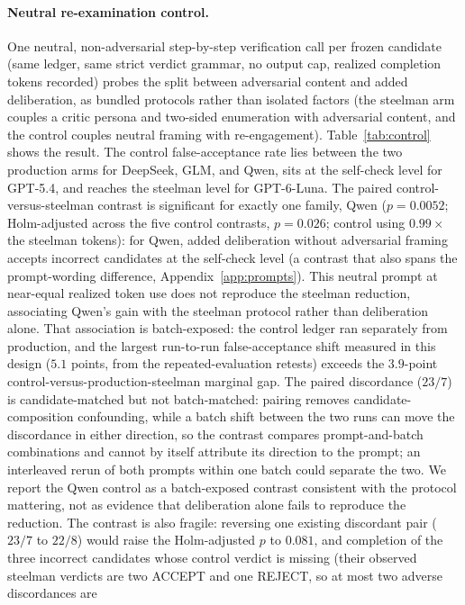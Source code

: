 \documentclass[a4paper,journal]{IAENGtran}
\begin{document}
\paragraph{Neutral re-examination control.} One neutral, non-adversarial step-by-step
verification call per frozen candidate (same ledger, same strict verdict grammar, no
output cap, realized completion tokens recorded) probes the split between adversarial content and
added deliberation, as bundled protocols rather than isolated factors (the steelman
arm couples a critic persona and two-sided enumeration with adversarial content, and
the control couples neutral framing with re-engagement). Table~\ref{tab:control} shows the result. The control
false-acceptance rate lies between the two production arms for DeepSeek, GLM, and
Qwen, sits at the self-check level for GPT-5.4, and reaches the steelman level for
GPT-6-Luna. The paired control-versus-steelman contrast is significant for exactly one
family, Qwen ($p=0.0052$; Holm-adjusted across the five control contrasts, $p=0.026$;
control using $0.99\times$ the steelman tokens): for Qwen, added deliberation
without adversarial framing accepts incorrect candidates at the self-check level
(a contrast that also spans the prompt-wording difference, Appendix~\ref{app:prompts}).
This neutral prompt at near-equal realized token use does not reproduce the steelman reduction,
associating Qwen's gain with the steelman protocol rather than deliberation alone. That
association is batch-exposed: the control ledger ran separately from production, and the
largest run-to-run false-acceptance shift measured in this design ($5.1$ points, from the
repeated-evaluation retests) exceeds the $3.9$-point control-versus-production-steelman
marginal gap. The paired discordance ($23/7$) is candidate-matched but not batch-matched:
pairing removes candidate-composition confounding, while a batch shift between the two
runs can move the discordance in either direction, so the contrast compares
prompt-and-batch combinations and cannot by itself attribute its direction to the
prompt; an interleaved rerun of both prompts within one batch could separate the two.
We report the Qwen control as a batch-exposed contrast consistent with the protocol
mattering, not as evidence that deliberation alone fails to reproduce the reduction.
The contrast is also fragile: reversing one existing discordant pair ($23/7$ to
$22/8$) would raise the Holm-adjusted $p$ to $0.081$, and completion of the three
incorrect candidates whose control verdict is missing (their observed steelman
verdicts are two ACCEPT and one REJECT, so at most two adverse discordances are
\end{document}
